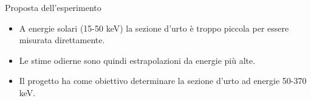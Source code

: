 \documentclass [xcolor=svgnames] {beamer}
\begin{document}
	\begin{frame}{Proposta dell'esperimento}
		\begin{itemize}
			\item<1-> A energie solari (15-50 keV) la sezione d'urto è troppo piccola per essere misurata direttamente.
			\item<2-> Le stime odierne sono quindi estrapolazioni da energie più alte.
			\item<3-> Il progetto ha come obiettivo determinare la sezione d'urto ad energie 50-370 keV.
		\end{itemize}
	\end{frame}
	
%	
%	
%	
%	
%	
\end{document}
